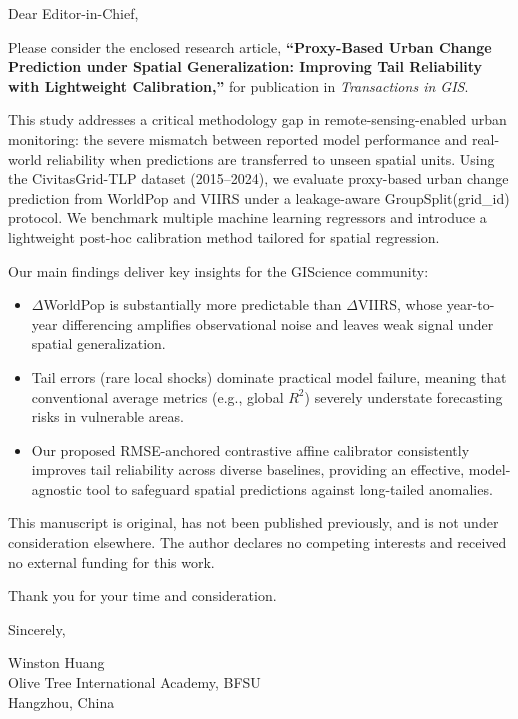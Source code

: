 \documentclass[12pt]{article}
\begin{document}
Dear Editor-in-Chief,

\vspace{0.5em}

Please consider the enclosed research article, \textbf{``Proxy-Based Urban Change Prediction under Spatial Generalization: Improving Tail Reliability with Lightweight Calibration,''} for publication in \textit{Transactions in GIS}.

\vspace{0.5em}

This study addresses a critical methodology gap in remote-sensing-enabled urban monitoring: the severe mismatch between reported model performance and real-world reliability when predictions are transferred to unseen spatial units. Using the CivitasGrid-TLP dataset (2015--2024), we evaluate proxy-based urban change prediction from WorldPop and VIIRS under a leakage-aware GroupSplit(grid\_id) protocol. We benchmark multiple machine learning regressors and introduce a lightweight post-hoc calibration method tailored for spatial regression.

\vspace{0.5em}

Our main findings deliver key insights for the GIScience community:
\begin{itemize}
    \item $\Delta$WorldPop is substantially more predictable than $\Delta$VIIRS, whose year-to-year differencing amplifies observational noise and leaves weak signal under spatial generalization.
    \item Tail errors (rare local shocks) dominate practical model failure, meaning that conventional average metrics (e.g., global $R^2$) severely understate forecasting risks in vulnerable areas.
    \item Our proposed RMSE-anchored contrastive affine calibrator consistently improves tail reliability across diverse baselines, providing an effective, model-agnostic tool to safeguard spatial predictions against long-tailed anomalies.
\end{itemize}

\vspace{0.5em}

This manuscript is original, has not been published previously, and is not under consideration elsewhere. The author declares no competing interests and received no external funding for this work.

\vspace{0.5em}

Thank you for your time and consideration.

\vspace{1.5em}

Sincerely,

\vspace{1.5em}

Winston Huang\\
Olive Tree International Academy, BFSU\\
Hangzhou, China
\end{document}

